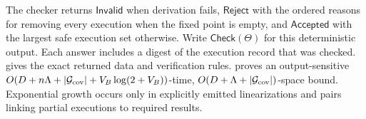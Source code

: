 The checker returns \(\mathsf{Invalid}\) when derivation fails, \(\mathsf{Reject}\) with the ordered reasons for removing every execution when the fixed point is empty, and \(\mathsf{Accepted}\) with the largest safe execution set otherwise.
Write \(\mathsf{Check}(\Theta)\) for this deterministic output.
Each answer includes a digest of the execution record that was checked.
 gives the exact returned data and verification rules.
 proves an output-sensitive \(O(D+n\Lambda+|\mathcal G_{\rm cov}|+V_B\log(2+V_B))\)-time, \(O(D+\Lambda+|\mathcal G_{\rm cov}|)\)-space bound.
Exponential growth occurs only in explicitly emitted linearizations and pairs linking partial executions to required results.
